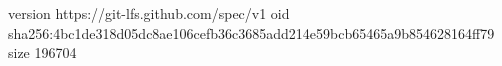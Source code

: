 version https://git-lfs.github.com/spec/v1
oid sha256:4bc1de318d05dc8ae106cefb36c3685add214e59bcb65465a9b854628164ff79
size 196704
